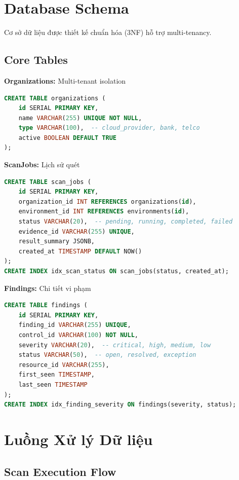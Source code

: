 \documentclass[12pt,a4paper]{report}
\begin{document}
\section{Database Schema}

Cơ sở dữ liệu được thiết kế chuẩn hóa (3NF) hỗ trợ multi-tenancy.

\subsection{Core Tables}

\textbf{Organizations:} Multi-tenant isolation
\begin{lstlisting}[language=SQL]
CREATE TABLE organizations (
    id SERIAL PRIMARY KEY,
    name VARCHAR(255) UNIQUE NOT NULL,
    type VARCHAR(100),  -- cloud_provider, bank, telco
    active BOOLEAN DEFAULT TRUE
);
\end{lstlisting}

\textbf{ScanJobs:} Lịch sử quét
\begin{lstlisting}[language=SQL]
CREATE TABLE scan_jobs (
    id SERIAL PRIMARY KEY,
    organization_id INT REFERENCES organizations(id),
    environment_id INT REFERENCES environments(id),
    status VARCHAR(20),  -- pending, running, completed, failed
    evidence_id VARCHAR(255) UNIQUE,
    result_summary JSONB,
    created_at TIMESTAMP DEFAULT NOW()
);
CREATE INDEX idx_scan_status ON scan_jobs(status, created_at);
\end{lstlisting}

\textbf{Findings:} Chi tiết vi phạm
\begin{lstlisting}[language=SQL]
CREATE TABLE findings (
    id SERIAL PRIMARY KEY,
    finding_id VARCHAR(255) UNIQUE,
    control_id VARCHAR(100) NOT NULL,
    severity VARCHAR(20),  -- critical, high, medium, low
    status VARCHAR(50),  -- open, resolved, exception
    resource_id VARCHAR(255),
    first_seen TIMESTAMP,
    last_seen TIMESTAMP
);
CREATE INDEX idx_finding_severity ON findings(severity, status);
\end{lstlisting}

\section{Luồng Xử lý Dữ liệu}

\subsection{Scan Execution Flow}
\end{document}
